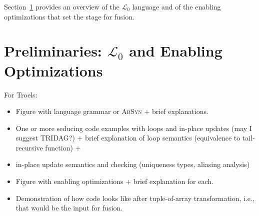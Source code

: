 \documentclass{sigplanconf}  %
\newcommand{\LO}{$\mathcal{L}_0$}
\begin{document}
Section~\ref{sec:Prelim} provides an overview of the \LO{} language %
and of the enabling optimizations that set the stage for fusion. %







\section{Preliminaries: $\mathcal{L}_0$ and Enabling Optimizations}
\label{sec:Prelim}

For Troels:
\begin{itemize}
    \item[1.] Figure with language grammar or \textsc{AbSyn} $+$ brief explanations.
    \item[2.] One or more seducing code examples with loops and in-place updates (may I suggest TRIDAG?) 
                $+$ brief explanation of loop semantics (equivalence to tail-recursive function) $+$
    \item[3.] in-place update semantics and checking (uniqueness types, aliasing analysis)
    \item[4.] Figure with enabling optimizations $+$ brief explanation for each.
    \item[5.] Demonstration of how code looks like after tuple-of-array transformation,
                i.e., that would be the input for fusion.
\end{itemize}
\end{document}
